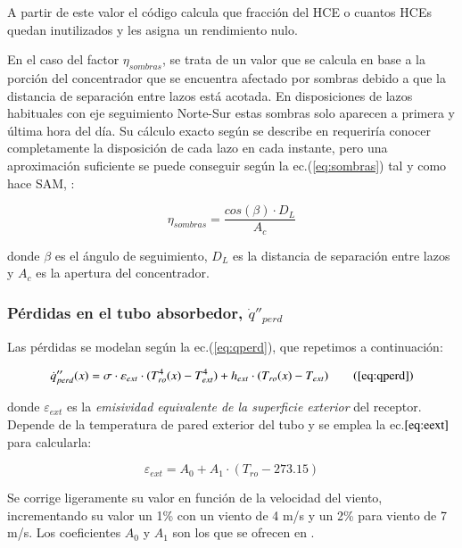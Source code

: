 A partir de este valor el código calcula que fracción del HCE o cuantos HCEs quedan inutilizados y les asigna un rendimiento nulo.

En el caso del factor \(\eta_{sombras}\), se trata de un valor que se calcula en base a la porción del concentrador que se encuentra afectado por sombras debido a que la distancia de separación entre lazos está acotada. En disposiciones de lazos habituales con eje seguimiento Norte-Sur estas sombras solo aparecen a primera y última hora del día. Su cálculo exacto según se describe en \cite{sharmaShadingAvailableEnergy2013} requeriría conocer completamente la disposición de cada lazo en cada instante, pero una aproximación suficiente se puede conseguir según la ec.(\eqref{eq:sombras}) tal y como hace SAM, \cite{gilmanSolarAdvisorModel2008}:

\begin{equation}
   \eta_{sombras} =  \frac {cos(\beta) \cdot D_L}{A_c}
    \label{eq:sombras}
\end{equation}

donde $\beta$ es el ángulo de seguimiento, $D_L$ es la distancia de separación entre lazos y $A_c$ es la apertura del concentrador.

\subsubsection{Pérdidas en el tubo absorbedor, $\dot q''_{perd}$}

Las pérdidas se modelan según la ec.(\ref{eq:qperd}), que repetimos a continuación:

\begin{equation}
\notag  \dot q''_{perd}(x)= \sigma \cdot \varepsilon_{ext} \cdot (T_{ro}^{4}(x)-T_{ext}^{4}) + h_{ext} \cdot (T_{ro}(x)-T_{ext}) \tag{\ref{eq:qperd}}
\end{equation}

donde   \(\varepsilon_{ext}\) es la \textit{emisividad equivalente de la superficie  exterior} del receptor. Depende de la temperatura de pared exterior del tubo y se emplea la ec.\(\eqref{eq:eext}\) para calcularla:

\begin{equation}
   \varepsilon_{ext} =  A_0 + A_1 \cdot  (T_{ro} - 273.15)
    \label{eq:eext}
\end{equation}

Se corrige ligeramente su valor en función de la velocidad del viento, incrementando su valor un 1\% con un viento de 4 m/s y un 2\% para viento de 7 m/s. Los coeficientes \(A_0\) y \(A_1\) son los que se ofrecen en \cite{barberofresnoDesarrolloModeloTeorico2018}.


